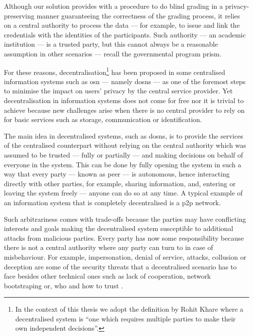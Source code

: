 \documentclass[showtrims,oldfontcommands]{kthesis}
\begin{document}

Although our solution provides with a procedure to do blind grading in a privacy-preserving 
manner guaranteeing the correctness of the grading process, it relies on a central 
authority to process the data --- for example, to issue and link the credentials with 
the identities of the participants. Such authority --- an academic institution --- 
is a trusted party, but this cannot always be a reasonable assumption in other scenarios 
--- recall the governmental program \ac{prism}.

For these reasons, decentralisation\footnote{In the context of this thesis we adopt 
the definition by Rohit Khare where a decentralised system is ``one which requires 
multiple parties to make their own independent decisions''.} has been proposed in 
some centralised information systems such as \ac{osn} --- namely \acp{dosn} --- 
as one of the foremost steps to minimise the impact on users' privacy by the central 
service provider. Yet decentralisation in information systems does not come for 
free nor it is trivial to achieve because new challenges arise when there is no 
central provider to rely on for basic services such as storage, communication or 
identification.

The main idea in decentralised systems, such as \acp{dosn}, is to provide the services 
of the centralised counterpart without relying on the central authority which was 
assumed to be trusted --- fully or partially --- and making decisions on behalf 
of everyone in the system. This can be done by fully opening the system in such 
a way that every party --- known as peer --- is autonomous, hence interacting directly 
with other parties, for example, sharing information, and, entering or leaving the 
system freely --- anyone can do so at any time. A typical example of an information 
system that is completely decentralised is a \ac{p2p} network.

Such arbitrariness comes with trade-offs because the parties may have conflicting 
interests and goals making the decentralised system susceptible to additional attacks 
from malicious parties. Every party has now some responsibility because there is 
not a central authority where any party can turn to in case of misbehaviour. For 
example, impersonation, denial of service, \Sybil attacks, collusion or deception 
are some of the security threats that a decentralised scenario has to face besides 
other technical ones such as lack of cooperation, network bootstraping or, who and 
how to trust \cite{BucheggerA09}.
\end{document}
